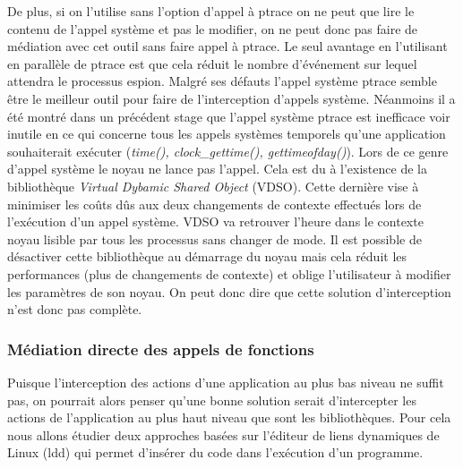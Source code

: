 De plus, si on l'utilise sans l'option d'appel à ptrace on ne peut que lire le
contenu de l'appel système et pas le modifier, on ne peut donc pas faire de
médiation avec cet outil sans faire appel à ptrace. Le seul avantage en
l'utilisant en parallèle de ptrace est que cela réduit le nombre d'événement sur
lequel attendra le processus espion.
\newline
Malgré ses défauts l'appel système ptrace semble être le meilleur outil pour
faire de l'interception d'appels système. Néanmoins il a été montré dans un
précédent stage \cite{INTERCEPTION:MARION} que l'appel système ptrace est
inefficace voir inutile en ce qui concerne tous les appels systèmes temporels
qu'une application souhaiterait exécuter (\textit{time(), clock\_gettime(),
  gettimeofday()}). Lors de ce genre d'appel système le noyau ne lance pas
l'appel. Cela est du à l'existence de la bibliothèque \textit{Virtual Dybamic
  Shared Object} (VDSO). Cette dernière vise à minimiser les coûts dûs aux deux
changements de contexte effectués lors de l'exécution d'un appel système. VDSO
va retrouver l'heure {\color{red}dans le contexte noyau} lisible par tous les
processus sans changer de mode. Il est possible de désactiver cette bibliothèque
au démarrage du noyau mais cela réduit les performances (plus de changements de
contexte) et oblige l'utilisateur à modifier les paramètres de son noyau. On
peut donc dire que cette solution d'interception n'est donc pas complète.


\subsubsection{Médiation directe des appels de fonctions}

Puisque l'interception des actions d'une application au plus bas niveau ne
suffit pas, on pourrait alors penser qu'une bonne solution serait d'intercepter
les actions de l'application au plus haut niveau que sont les
bibliothèques. Pour cela nous allons étudier deux approches basées sur l'éditeur
de liens dynamiques de Linux (ldd) qui permet d'insérer du code dans l'exécution
d'un programme.

